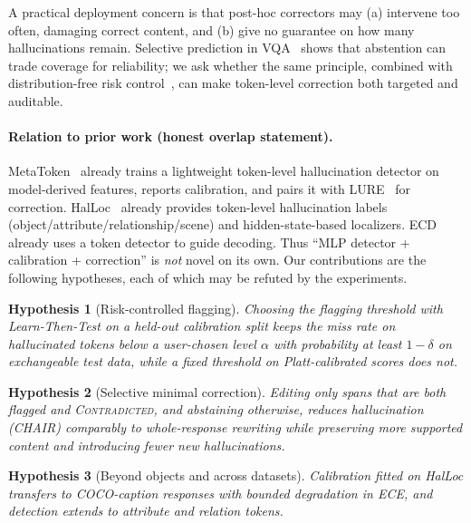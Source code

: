 \documentclass[11pt]{article}
\newtheorem{hypothesis}{Hypothesis}
\begin{document}
A practical deployment concern is that post-hoc correctors may (a) intervene too often, damaging correct content, and (b) give no guarantee on how many hallucinations remain. Selective prediction in VQA~\cite{whitehead2022reliable} shows that abstention can trade coverage for reliability; we ask whether the same principle, combined with distribution-free risk control~\cite{angelopoulos2025ltt,angelopoulos2022crc}, can make token-level correction both targeted and auditable.

\paragraph{Relation to prior work (honest overlap statement).}
MetaToken~\cite{fieback2024metatoken} already trains a lightweight token-level hallucination detector on model-derived features, reports calibration, and pairs it with LURE~\cite{zhou2024lure} for correction. HalLoc~\cite{park2025halloc} already provides token-level hallucination labels (object/attribute/relationship/scene) and hidden-state-based localizers. ECD~\cite{fieback2025ecd} already uses a token detector to guide decoding. Thus ``MLP detector + calibration + correction'' is \emph{not} novel on its own. Our contributions are the following hypotheses, each of which may be refuted by the experiments.

\begin{hypothesis}[Risk-controlled flagging]\label{hyp:ltt}
Choosing the flagging threshold with Learn-Then-Test on a held-out calibration split keeps the miss rate on hallucinated tokens below a user-chosen level $\alpha$ with probability at least $1-\delta$ on exchangeable test data, while a fixed threshold on Platt-calibrated scores does not.
\end{hypothesis}
\begin{hypothesis}[Selective minimal correction]\label{hyp:minimal}
Editing only spans that are both flagged and \textsc{Contradicted}, and abstaining otherwise, reduces hallucination (CHAIR) comparably to whole-response rewriting while preserving more supported content and introducing fewer new hallucinations.
\end{hypothesis}
\begin{hypothesis}[Beyond objects and across datasets]\label{hyp:transfer}
Calibration fitted on HalLoc transfers to COCO-caption responses with bounded degradation in ECE, and detection extends to attribute and relation tokens.
\end{hypothesis}
\end{document}
